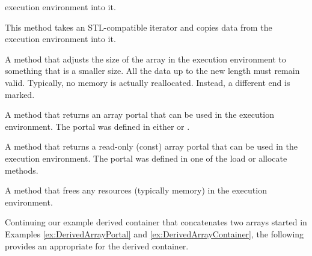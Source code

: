\begin{description}
  execution environment into it.
\item[\textcode{CopyInto}] This method takes an STL-compatible iterator and
  copies data from the execution environment into it.
\item[\textcode{Shrink}] A method that adjusts the size of the array in the
  execution environment to something that is a smaller size. All the data
  up to the new length must remain valid. Typically, no memory is actually
  reallocated. Instead, a different end is marked.
\item[\textcode{GetPortalExecution}] A method that returns an array portal
  that can be used in the execution environment. The portal was defined in
  either  or
  .
\item[\textcode{GetPortalConstExecution}] A method that returns a read-only
  (const) array portal that can be used in the execution environment. The
  portal was defined in one of the load or allocate methods.
\item[\textcode{ReleaseResources}] A method that frees any resources
  (typically memory) in the execution environment.
\end{description}

Continuing our example derived container that concatenates two arrays
started in Examples \ref{ex:DerivedArrayPortal} and
\ref{ex:DerivedArrayContainer}, the following provides an
 appropriate for the derived container.

